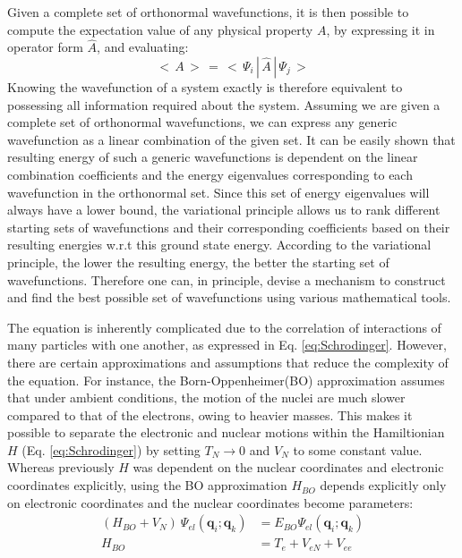             Given a complete set of orthonormal wavefunctions, it is then possible to compute the expectation value of any physical property $A$, by expressing it in operator form $\hat{A}$, and evaluating:
            \begin{equation}\label{eq:expectation value}
                <\,A\,>\, =\, < \,\Psi_i\,|\,\hat{A}\,|\, \Psi_j\,>
            \end{equation}
            Knowing the wavefunction of a system exactly is therefore equivalent to possessing all information required about the system. Assuming we are given a complete set of orthonormal wavefunctions, we can express any generic wavefunction as a linear combination of the given set. It can be easily shown that resulting energy of such a generic wavefunctions is dependent on the linear combination coefficients and the energy eigenvalues corresponding to each wavefunction in the orthonormal set. Since this set of energy eigenvalues will always have a lower bound, the variational principle allows us to rank different starting sets of wavefunctions and their corresponding coefficients based on their resulting energies w.r.t this ground state energy. According to the variational principle, the lower the resulting energy, the better the starting set of wavefunctions. Therefore one can, in principle, devise a mechanism to construct and find the best possible set of wavefunctions using various mathematical tools.

            The \Schrodinger{} equation is inherently complicated due to the correlation of interactions of many particles with one another, as expressed in Eq. \eqref{eq:Schrodinger}. However, there are certain approximations and assumptions that reduce the complexity of the equation. For instance, the Born-Oppenheimer(BO) approximation assumes that under ambient conditions, the motion of the nuclei are much slower compared to that of the electrons, owing to heavier masses. This makes it possible to separate the electronic and nuclear motions within the Hamiltionian $H$ (Eq. \eqref{eq:Schrodinger}) by setting $T_N \to 0$ and $V_N$ to some constant value. Whereas previously $H$ was dependent on the nuclear coordinates and electronic coordinates explicitly, using the BO approximation $H_{BO}$ depends explicitly only on electronic coordinates and the nuclear coordinates become parameters:
            \begin{equation}\label{eq:BO approximation}
                \begin{aligned}
                    (H_{BO} + V_N)~\Psi_{el} (\mathbf{q}_i;\mathbf{q}_k) &= E_{BO} \Psi_{el} (\mathbf{q}_i;\mathbf{q}_k)\\
                    H_{BO} &= T_e + V_{eN} + V_{ee}
                \end{aligned}
            \end{equation}

